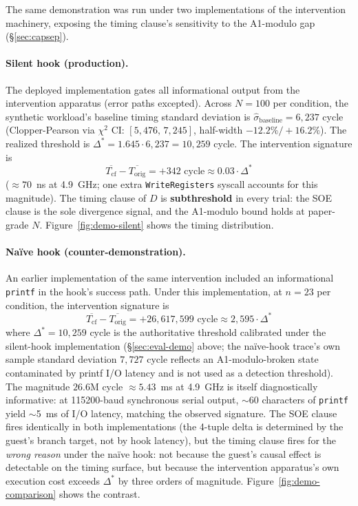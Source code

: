 \documentclass[conference]{IEEEtran}
\newcommand{\sigbase}{\hat{\sigma}_\text{baseline}}
\newcommand{\Dstar}{\Delta^{*}}
\begin{document}
The same demonstration was run under two implementations of the
intervention machinery, exposing the timing clause's sensitivity to
the A1-modulo gap (\S\ref{sec:capsep}).

\paragraph{Silent hook (production).} The deployed implementation
gates all informational output from the intervention apparatus
(error paths excepted). Across $N{=}100$ per condition, the
synthetic workload's baseline timing standard deviation is
$\sigbase = 6{,}237$ cycle (Clopper-Pearson via $\chi^2$ CI:
$[5{,}476,\, 7{,}245]$, half-width $-12.2\%/+16.2\%$). The realized
threshold is $\Dstar = 1.645 \cdot 6{,}237 = 10{,}259$ cycle. The
intervention signature is
\begin{equation*}
\overline{T_\text{cf}} - \overline{T_\text{orig}} = +342 \text{ cycle} \approx 0.03 \cdot \Dstar
\end{equation*}
(${\approx}70$~ns at 4.9~GHz; one extra \texttt{WriteRegisters}
syscall accounts for this magnitude). The timing clause of $D$ is
\textbf{subthreshold} in every trial: the SOE clause is the sole
divergence signal, and the A1-modulo bound holds at paper-grade
$N$. Figure~\ref{fig:demo-silent} shows the timing distribution.

\paragraph{Naïve hook (counter-demonstration).} An earlier
implementation of the same intervention included an informational
\texttt{printf} in the hook's success path. Under this
implementation, at $n{=}23$ per condition, the intervention
signature is
\begin{equation*}
\overline{T_\text{cf}} - \overline{T_\text{orig}} = +26{,}617{,}599 \text{ cycle} \approx 2{,}595 \cdot \Dstar
\end{equation*}
where $\Dstar = 10{,}259$ cycle is the authoritative threshold
calibrated under the silent-hook implementation
(\S\ref{sec:eval-demo} above; the naïve-hook trace's own sample
standard deviation $7{,}727$ cycle reflects an A1-modulo-broken
state contaminated by printf I/O latency and is not used as a
detection threshold). The magnitude
$26.6$M cycle $\approx 5.43$~ms at 4.9~GHz is itself
diagnostically informative: at 115200-baud synchronous serial
output, $\sim$60 characters of \texttt{printf} yield $\sim$5~ms
of I/O latency, matching the observed signature. The SOE clause
fires identically in both implementations (the 4-tuple delta is
determined by the guest's branch target, not by hook latency),
but the timing clause fires for the \emph{wrong reason} under the
naïve hook: not because the guest's causal effect is detectable
on the timing surface, but because the intervention apparatus's
own execution cost exceeds $\Dstar$ by three orders of magnitude.
Figure~\ref{fig:demo-comparison} shows the contrast.
\end{document}
